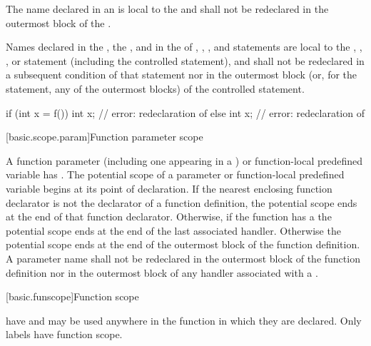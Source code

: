 \pnum
{}%
The name declared in an 
is local to the
 and shall not be redeclared in the outermost block of the
.

\pnum
Names declared in the , the , and in the
 of , , , and
 statements are local to the , ,
, or  statement (including the controlled
statement), and shall not be redeclared in a subsequent condition of
that statement nor in the outermost block (or, for the 
statement, any of the outermost blocks) of the controlled statement.
\begin{example}
\begin{codeblock}
if (int x = f()) {
  int x;            // error: redeclaration of 
}
else {
  int x;            // error: redeclaration of 
}
\end{codeblock}
\end{example}

[basic.scope.param]{Function parameter scope}

\pnum
{}%
%
%
A function parameter
(including one appearing in a
)
or function-local predefined variable
has .
The potential scope of a parameter
or function-local predefined variable
begins at its point of declaration. If
the nearest enclosing function declarator
is not the declarator of a function definition,
the potential scope ends at the end of that function declarator.
Otherwise, if
the function has a  the potential scope
ends at the end of the last associated handler.
Otherwise the potential scope ends
at the end of the outermost block of the function definition. A
parameter name shall not be redeclared in the outermost block of the
function definition nor in the outermost block of any handler associated
with a .

[basic.funscope]{Function scope}

\pnum
{}%
 have  and
may be used anywhere in the function in which they are declared. Only
labels have function scope.

